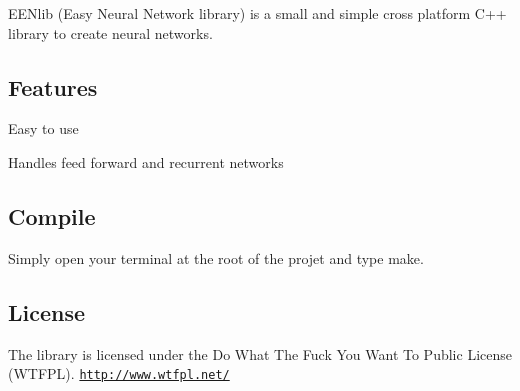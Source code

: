 E\+E\+Nlib (Easy Neural Network library) is a small and simple cross platform C++ library to create neural networks.

\subsection*{Features}


\begin{DoxyItemize}
\item Easy to use
\item Handles feed forward and recurrent networks
\end{DoxyItemize}

\subsection*{Compile}

Simply open your terminal at the root of the projet and type make.

\subsection*{License}

The library is licensed under the Do What The Fuck You Want To Public License (W\+T\+F\+P\+L). \href{http://www.wtfpl.net/}{\tt http\+://www.\+wtfpl.\+net/} 